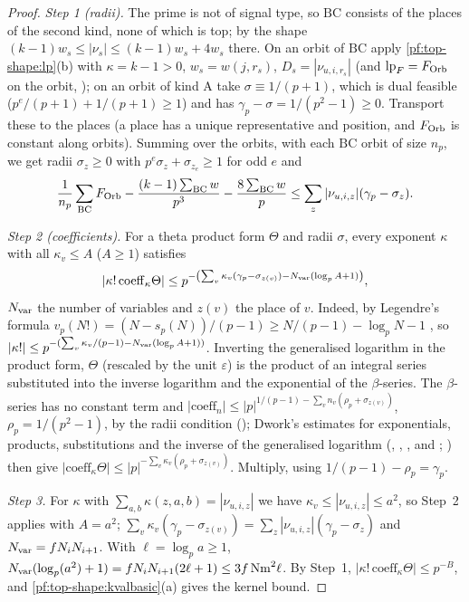 \begin{proof}
\emph{Step 1 (radii).} The prime is not of signal type, so $\mathrm{BC}$ consists of the places of the second kind, none of
which is top; by the shape $(k-1)w_s\le|\nu_s|\le(k-1)w_s+4w_s$ there. On an orbit of $\mathrm{BC}$ apply
\cref{pf:top-shape:lp}(b) with $\kappa=k-1>0$, $w_s=w(j,r_s)$, $D_s=|\nu_{u,i,r_s}|$ (and $\mathrm{lp}_F=F_{\rm Orb}$ on the
orbit, ); on an orbit of kind A take $\sigma\equiv1/(p+1)$, which is dual feasible
($p^e/(p+1)+1/(p+1)\ge1$) and has $\gamma_p-\sigma=1/(p^2-1)\ge0$. Transport these to the places (a place has a unique
representative and position, and $F_{\rm Orb}$ is constant along orbits). Summing over the orbits, with each $\mathrm{BC}$ orbit
of size $n_p$, we get radii $\sigma_z\ge0$ with $p^e\sigma_z+\sigma_{z_e}\ge1$ for odd $e$ and
\[
\frac1{n_p}\sum_{\rm BC}F_{\rm Orb}-\frac{(k-1)\sum_{\rm BC}w}{p^3}-\frac{8\sum_{\rm BC}w}p\le\sum_z|\nu_{u,i,z}|(\gamma_p-\sigma_z).
\]

\emph{Step 2 (coefficients).} For a theta product form $\Theta$ and radii $\sigma$, every exponent $\kappa$ with all
$\kappa_v\le A$ ($A\ge1$) satisfies
\[
|\kappa!\,\mathrm{coeff}_\kappa\Theta|\le p^{-\left(\sum_v\kappa_v(\gamma_p-\sigma_{z(v)})-N_{\rm var}(\log_pA+1)\right)},
\]
$N_{\rm var}$ the number of variables and $z(v)$ the place of $v$. Indeed, by Legendre's formula
$v_p(N!)=(N-s_p(N))/(p-1)\ge N/(p-1)-\log_pN-1$ \cite{Robert2000}, so $|\kappa!|\le p^{-(\sum_v\kappa_v/(p-1)-N_{\rm var}(\log_pA+1))}$.
Inverting the generalised logarithm in the product form, $\Theta$ (rescaled by the unit $\varepsilon$) is the product of an
integral series substituted into the inverse logarithm and the exponential of the $\beta$-series. The $\beta$-series has no
constant term and $|\mathrm{coeff}_n|\le|p|^{1/(p-1)-\sum_vn_v(\rho_p+\sigma_{z(v)})}$, $\rho_p=1/(p^2-1)$, by the radii
condition (); Dwork's estimates for exponentials, products,
substitutions and the inverse of the generalised logarithm
(, , , and ;
\cite{Dwork1962,Robert2000}) then give $|\mathrm{coeff}_\kappa\Theta|\le|p|^{-\sum_v\kappa_v(\rho_p+\sigma_{z(v)})}$. Multiply, using
$1/(p-1)-\rho_p=\gamma_p$.

\emph{Step 3.} For $\kappa$ with $\sum_{a,b}\kappa(z,a,b)=|\nu_{u,i,z}|$ we have $\kappa_v\le|\nu_{u,i,z}|\le a^2$, so Step~2
applies with $A=a^2$; $\sum_v\kappa_v(\gamma_p-\sigma_{z(v)})=\sum_z|\nu_{u,i,z}|(\gamma_p-\sigma_z)$ and
$N_{\rm var}=fN_iN_{i+1}$. With $\ell=\log_pa\ge1$, $N_{\rm var}(\log_p(a^2)+1)=fN_iN_{i+1}(2\ell+1)\le3f\,\mathrm{Nm}^2\ell$.
By Step~1, $|\kappa!\,\mathrm{coeff}_\kappa\Theta|\le p^{-B}$, and \cref{pf:top-shape:kvalbasic}(a) gives the kernel bound.


\end{proof}
